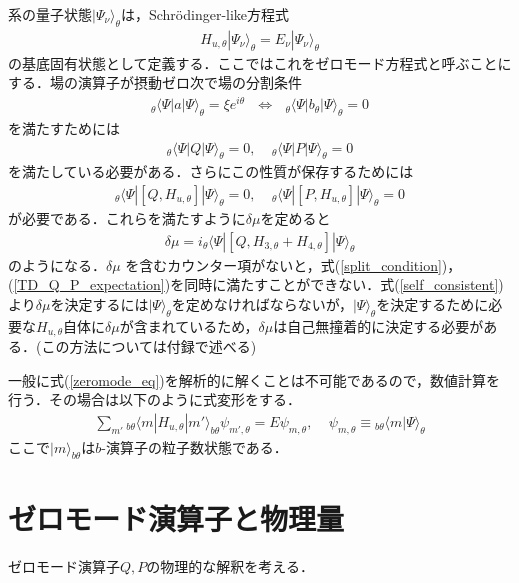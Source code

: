\documentclass[10.5pt,a4paper]{jreport}
\begin{document}
系の量子状態$|\Psi_\nu\rangle_\theta$は，Schr\"{o}dinger-like方程式
\begin{eqnarray}
  H_{u,\theta}|\Psi_\nu\rangle_\theta = E_\nu|\Psi_\nu\rangle_\theta \label{zeromode_eq}
\end{eqnarray}
の基底固有状態として定義する．ここではこれをゼロモード方程式と呼ぶことにする．場の演算子が摂動ゼロ次で場の分割条件
\begin{eqnarray}
  _\theta\langle\Psi|a|\Psi\rangle_\theta = \xi e^{i\theta} \ \ \  \Longleftrightarrow\ \ \  _\theta\langle\Psi|b_\theta|\Psi\rangle_\theta =0
\end{eqnarray}
を満たすためには
\begin{eqnarray}
  _\theta\langle\Psi|Q|\Psi\rangle_\theta = 0,\ \ \ \ \ _\theta\langle\Psi|P|\Psi\rangle_\theta = 0\label{split_condition}
\end{eqnarray}
を満たしている必要がある．さらにこの性質が保存するためには
\begin{eqnarray}
  _\theta\langle\Psi|[Q,H_{u,\theta}]|\Psi\rangle_\theta = 0,\ \ \ \ \ _\theta\langle\Psi|[P,H_{u,\theta}]|\Psi\rangle_\theta = 0\label{TD_Q_P_expectation}
\end{eqnarray}
が必要である．これらを満たすように$\delta \mu$を定めると
\begin{eqnarray}
  \delta \mu = i_\theta\langle\Psi|[Q,H_{3,\theta}+H_{4,\theta}]|\Psi\rangle_\theta\label{self_consistent}
\end{eqnarray}
のようになる．$\delta \mu$ を含むカウンター項がないと，式(\ref{split_condition})，(\ref{TD_Q_P_expectation})を同時に満たすことができない．式(\ref{self_consistent})より$\delta \mu$を決定するには$|\Psi\rangle_\theta$を定めなければならないが，$|\Psi\rangle_\theta$を決定するために必要な$H_{u,\theta}$自体に$\delta \mu$が含まれているため，$\delta \mu$は自己無撞着的に決定する必要がある．(この方法については付録で述べる)

一般に式(\ref{zeromode_eq})を解析的に解くことは不可能であるので，数値計算を行う．その場合は以下のように式変形をする．
\begin{eqnarray}
  \sum_{m'} {_{b\theta}\langle m|H_{u,\theta}|m' \rangle_{b\theta}}\psi_{m',\theta} = E\psi_{m,\theta}, \ \ \ \ \ 
  \psi_{m,\theta} \equiv {_{b\theta}\langle m|\Psi \rangle_\theta}\label{igen_eq}
\end{eqnarray}
ここで$|m \rangle_{b\theta}$は$b$-演算子の粒子数状態である．
\section{ゼロモード演算子と物理量}
ゼロモード演算子$Q,P$の物理的な解釈を考える．
\end{document}
